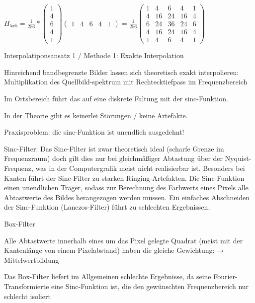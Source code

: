 \documentclass[landscape]{article}
\begin{document}
\begin{multicols}{3}
  $H_{5x5} =\frac{1}{256} * \begin{pmatrix} 1\\4\\6\\4\\1 \end{pmatrix} \begin{pmatrix} 1&4&6&4&1 \end{pmatrix}=\frac{1}{256} \begin{pmatrix} 1&4&6&4&1\\ 4&16&24&16&4\\ 6&24&36&24&6\\ 4&16&24&16&4\\ 1&4&6&4&1 \end{pmatrix}$
  
  Interpolatiponsansatz 1 / Methode 1: Exakte Interpolation
  \begin{itemize*}
    \item Hinreichend bandbegrenzte Bilder lassen sich theoretisch exakt interpolieren: Multiplikation des Quellbild-spektrum mit Rechtecktiefpass im Frequenzbereich
    \item Im Ortsbereich führt das auf eine diskrete Faltung mit der sinc-Funktion.
    \item In der Theorie gibt es keinerlei Störungen / keine Artefakte.
    \item Praxisproblem: die sinc-Funktion ist unendlich ausgedehnt!
  \end{itemize*}
  
  Sinc-Filter: Das Sinc-Filter ist zwar theoretisch ideal (scharfe Grenze im Frequenzraum) doch gilt dies nur bei gleichmäßiger Abtastung über der Nyquist-Frequenz, was in der Computergrafik meist nicht realisierbar ist. Besonders bei Kanten führt der Sinc-Filter zu starken Ringing-Artefakten. 
  Die Sinc-Funktion einen unendlichen Träger, sodass zur Berechnung des Farbwerts eines Pixels alle Abtastwerte des Bildes herangezogen werden müssen. Ein einfaches Abschneiden der Sinc-Funktion (Lanczos-Filter) führt zu schlechten Ergebnissen.
  
  \begin{itemize*}
    \item Box-Filter
    \begin{itemize*}
      \item Alle Abtastwerte innerhalb eines um das Pixel gelegte Quadrat (meist mit der Kantenlänge von einem Pixelabstand) haben die gleiche Gewichtung: → Mittelwertbildung
      \item Das Box-Filter liefert im Allgemeinen schlechte Ergebnisse, da seine Fourier-Transformierte eine Sinc-Funktion ist, die den gewünschten Frequenzbereich nur schlecht isoliert
    \end{itemize*}
    

\end{itemize*}
\end{multicols}
\end{document}
